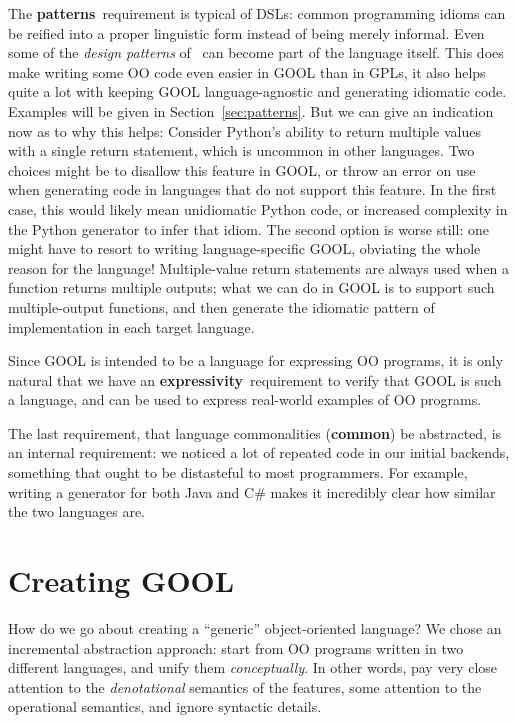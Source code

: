 \documentclass[sigplan,review,anonymous,prologue,dvipsnames]{acmart}
\newcommand{\Csharp}{C\#}
\newcommand{\abbrev}[1]{\textbf{#1}}
\newcommand{\oopatterns}{\abbrev{patterns}}
\newcommand{\common}{\abbrev{common}}
\newcommand{\expressivity}{\abbrev{expressivity}}
\begin{document}
The \oopatterns~requirement is typical of DSLs: common programming idioms
can be reified into a proper linguistic form instead of being merely
informal. Even some of the \emph{design patterns} of~\cite{gamma1995design}
can become part of the language itself. This does make writing some OO
code even easier in GOOL than in GPLs, it also helps quite a lot with
keeping GOOL language-agnostic and generating idiomatic code.
Examples will be given in Section~\ref{sec:patterns}.  But we can give an
indication now as to why this helps: Consider Python's
ability to return multiple values with a single return statement, which
is uncommon in other languages.  Two choices might be to disallow this
feature in GOOL, or throw an error on use when generating code in languages
that do not support this feature. In the first case, this would likely mean
unidiomatic Python code, or increased complexity in the Python generator to
infer that idiom. The second option is worse still: one might have to resort
to writing language-specific GOOL, obviating the whole reason for the language!
Multiple-value return statements are always used when a function returns multiple
outputs; what we can do in GOOL is to support such multiple-output functions,
and then generate the idiomatic pattern of implementation in each target
language.

Since GOOL is intended to be a language for expressing OO programs, it is only 
natural that we have an \expressivity~requirement to verify that GOOL is such a 
language, and can be used to express real-world examples of OO programs.

The last requirement, that language commonalities (\common) be abstracted,
is an
internal requirement: we noticed a lot of repeated code in our initial
backends, something that ought to be distasteful to most programmers. For
example, writing a generator for both Java and \Csharp{} makes it incredibly
clear how similar the two languages are.

\section{Creating GOOL} \label{sec:creating}

How do we go about creating a ``generic'' object-oriented language?
We chose an incremental abstraction approach: start from OO programs written in 
two different languages,
and unify them \emph{conceptually}. In other words, pay very close
attention to the \emph{denotational} semantics of the features, some
attention to the operational semantics, and ignore syntactic details. 
\end{document}
